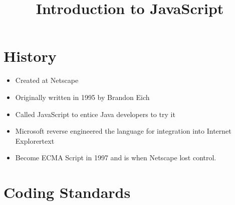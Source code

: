 \documentclass {amsart}
\title {Introduction to JavaScript}
\begin{document}
\maketitle

\section {History}

\begin{itemize}
	\item Created at Netscape
	\item Originally written in 1995 by Brandon Eich
	\item Called JavaScript to entice Java developers to try it
	\item Microsoft reverse engineered the language for integration into Internet Explorertext
	\item Become ECMA Script in 1997 and is when Netscape lost control. 
\end{itemize}


\section{Coding Standards}
\end{document}

